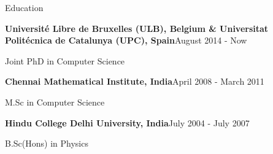 \documentclass{resume} %
\begin{document}
\begin{rSection}{Education}
\begin{rSubsection}{\bf Universit\'{e} Libre de Bruxelles (ULB), Belgium \&  Universitat Polit\'{e}cnica de Catalunya (UPC), Spain}{August 2014 - Now}{}{}  
\item Joint PhD in Computer Science 
\end{rSubsection}
\begin{rSubsection}{\bf Chennai Mathematical Institute, India}{April 2008 - March 2011}{}{}  
\item M.Sc in Computer Science 
\end{rSubsection}
\begin{rSubsection}{\bf Hindu College Delhi University, India}{July 2004 - July 2007}{}{}  
\item B.Sc(Hons) in Physics
\end{rSubsection}
\end{rSection}
\end{document}
